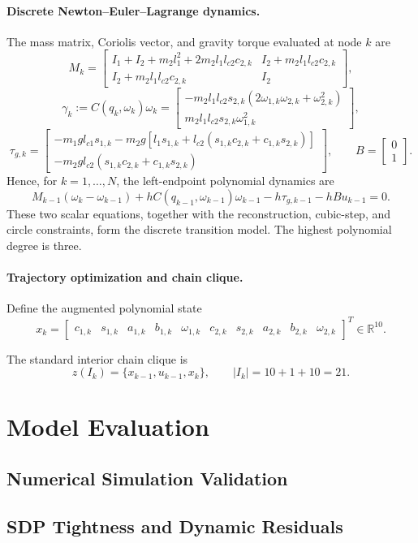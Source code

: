 \paragraph{Discrete Newton--Euler--Lagrange dynamics.}
The mass matrix, Coriolis vector, and gravity torque evaluated at node
$k$ are
\[
M_k=
\begin{bmatrix}
I_1+I_2+m_2l_1^2+2m_2l_1l_{c2}c_{2,k}
&
I_2+m_2l_1l_{c2}c_{2,k}
\\
I_2+m_2l_1l_{c2}c_{2,k}
&
I_2
\end{bmatrix},
\]
\[
\gamma_k:=C(q_k,\omega_k)\omega_k
=
\begin{bmatrix}
-m_2l_1l_{c2}s_{2,k}
\left(
2\omega_{1,k}\omega_{2,k}
+\omega_{2,k}^2
\right)
\\
m_2l_1l_{c2}s_{2,k}\omega_{1,k}^2
\end{bmatrix},
\]
\[
\tau_{g,k}
=
\begin{bmatrix}
-m_1gl_{c1}s_{1,k}
-m_2g\!\left[
l_1s_{1,k}
+l_{c2}
\left(
s_{1,k}c_{2,k}
+c_{1,k}s_{2,k}
\right)
\right]
\\
-m_2gl_{c2}
\left(
s_{1,k}c_{2,k}
+c_{1,k}s_{2,k}
\right)
\end{bmatrix},
\qquad
B=
\begin{bmatrix}
0\\1
\end{bmatrix}.
\]
Hence, for $k=1,\ldots,N$, the left-endpoint polynomial dynamics are
\[
\boxed{
M_{k-1}\left(\omega_k-\omega_{k-1}\right)
+hC(q_{k-1},\omega_{k-1})\omega_{k-1}
-h\tau_{g,k-1}
-hBu_{k-1}=0.
}
\]
These two scalar equations, together with the reconstruction, cubic-step,
and circle constraints, form the discrete transition model. The highest
polynomial degree is three.

\paragraph{Trajectory optimization and chain clique.}
Define the augmented polynomial state
\[
x_k=
\begin{bmatrix}
c_{1,k}&s_{1,k}&a_{1,k}&b_{1,k}&\omega_{1,k}&
c_{2,k}&s_{2,k}&a_{2,k}&b_{2,k}&\omega_{2,k}
\end{bmatrix}^{\!T}\in\mathbb{R}^{10}.
\]

The standard interior chain clique is
\[
\boxed{
z(I_k)=\{x_{k-1},u_{k-1},x_k\},
\qquad |I_k|=10+1+10=21.
}
\]

\section{Model Evaluation}
\label{appenidx:model_evaluation}

\subsection{Numerical Simulation Validation}
\label{appendix:numerical_simulation_validation}

\subsection{SDP Tightness and Dynamic Residuals}
\label{appendix:SDP_tightness_and_dynamic_residuals}

